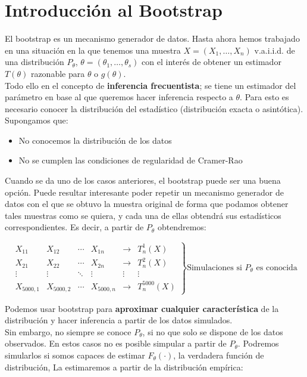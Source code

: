 \section{Introducción al Bootstrap}

El bootstrap es un mecanismo generador de datos. Hasta ahora hemos trabajado en una situación en la que tenemos una muestra $X=(X_1,\dots,X_n)$ v.a.i.i.d. de una distribución $P_\theta$, $\theta=(\theta_1,\dots,\theta_s)$ con el interés de obtener un estimador $T(\theta)$ razonable para $\theta$ o $g(\theta)$.\\

Todo ello en el concepto de \textbf{inferencia frecuentista}; se tiene un estimador del parámetro en base al que queremos hacer inferencia respecto a $\theta$.
Para esto es necesario conocer la distribución del estadístico  (distribución exacta o asintótica). Supongamos que:
\begin{itemize}
    \item No conocemos la distribución de los datos
    \item No se cumplen las condiciones de regularidad de Cramer-Rao
\end{itemize}

Cuando se da uno de los casos anteriores, el bootstrap puede ser una buena opción. Puede resultar interesante poder repetir un mecanismo generador de datos con el que se obtuvo la muestra original de forma que podamos obtener tales muestras como se quiera, y cada una de ellas obtendrá sus estadísticos correspondientes. Es decir, a partir de $P_\theta$ obtendremos:

$$\left.
    \begin{matrix}
        X_{11} & X_{12} & \cdots & X_{1n} & \longrightarrow & T^{1}_n(X)\\
        X_{21} & X_{22} & \cdots & X_{2n} & \longrightarrow & T^{2}_n(X)\\
        \vdots &\vdots & \ddots & \vdots & \vdots & \vdots\\
        X_{5000,1} & X_{5000,2} & \cdots & X_{5000,n} & \longrightarrow & T^{5000}_n(X)
    \end{matrix}
    \right\}\text{Simulaciones si $P_\theta$ es conocida}$$

Podemos usar bootstrap para \textbf{aproximar cualquier característica} de la distribución y hacer inferencia a partir de los datos simulados.\\

Sin embargo, no siempre se conoce $P_\theta$, si no que solo se dispone de los datos observados. En estos casos no es posible simpular a partir de $P_\theta$.
Podremos simularlos si somos capaces de estimar $F_\theta(\cdot)$, la verdadera función de distribución, La estimaremos a partir de la distribución empírica:

